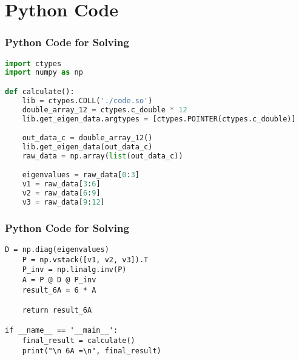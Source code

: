 \documentclass{beamer}
\theoremstyle{remark}
\numberwithin{equation}{section}
\begin{document}
\section{Python Code}
\begin{frame}[fragile]
\frametitle{Python Code for Solving}
\begin{lstlisting}[language=Python]
import ctypes
import numpy as np

def calculate():
    lib = ctypes.CDLL('./code.so')
    double_array_12 = ctypes.c_double * 12
    lib.get_eigen_data.argtypes = [ctypes.POINTER(ctypes.c_double)]

    out_data_c = double_array_12()
    lib.get_eigen_data(out_data_c)
    raw_data = np.array(list(out_data_c))

    eigenvalues = raw_data[0:3]
    v1 = raw_data[3:6]
    v2 = raw_data[6:9]
    v3 = raw_data[9:12]
\end{lstlisting}
\end{frame}
 \begin{frame}[fragile]
\frametitle{Python Code for Solving}
\begin{lstlisting} 
D = np.diag(eigenvalues)
    P = np.vstack([v1, v2, v3]).T
    P_inv = np.linalg.inv(P)
    A = P @ D @ P_inv
    result_6A = 6 * A
    
    return result_6A

if __name__ == '__main__':
    final_result = calculate()
    print("\n 6A =\n", final_result)
\end{lstlisting}
\end{frame}
 
\end{document}
